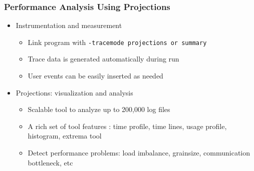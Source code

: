 \begin{frame}
  \frametitle{Performance Analysis Using Projections}
  \begin{itemize}
  \item Instrumentation and measurement
  \begin{itemize}
  \item Link program with {\tt -tracemode projections or summary}
  \item Trace data is generated automatically during run
  \item User events can be easily inserted as needed
  \end{itemize}
  \item Projections: visualization and analysis
  \begin{itemize}
  \item Scalable tool to analyze up to 200,000 log files
  \item A rich set of tool features : time profile, time lines, usage profile, histogram, extrema tool
  \item Detect performance problems: load imbalance, grainsize, communication bottleneck, etc 
  \end{itemize}
  \end{itemize}

\end{frame}
